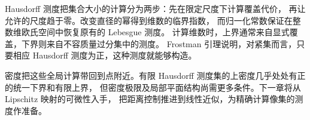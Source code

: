 




\begin{chaptersummary}
Hausdorff 测度把集合大小的计算分为两步：先在限定尺度下计算覆盖代价，
再让允许的尺度趋于零。改变直径的幂得到维数的临界指数，
而归一化常数保证在整数维欧氏空间中恢复原有的 Lebesgue 测度。
计算维数时，上界通常来自显式覆盖，下界则来自不容质量过分集中的测度。
Frostman 引理说明，对紧集而言，只要相应 Hausdorff 测度为正，这种测度就能够构造。

\ProseParagraphBreak

密度把这些全局计算带回到点附近。有限 Hausdorff 测度集的上密度几乎处处有正的统一下界和有限上界，
但密度极限及局部平面结构尚需更多条件。下一章将从 Lipschitz 映射的可微性入手，
把距离控制推进到线性近似，为精确计算像集的测度作准备。
\end{chaptersummary}


\BookExercises



